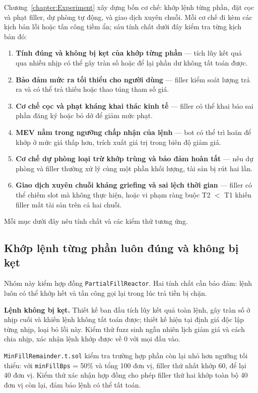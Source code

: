 \documentclass[../DoAn.tex]{subfiles}
\begin{document}
Chương~\ref{chapter:Experiment} xây dựng bốn cơ chế: khớp lệnh từng phần, đặt cọc và phạt filler, dự phòng tự động, và giao dịch xuyên chuỗi. Mỗi cơ chế đi kèm các kịch bản lỗi hoặc tấn công tiềm ẩn; sáu tính chất dưới đây kiểm tra từng kịch bản đó:
\begin{enumerate}
    \item \textbf{Tính đúng và không bị kẹt của khớp từng phần} --- tích lũy kết quả qua nhiều nhịp có thể gây tràn số hoặc để lại phần dư không tất toán được.
    \item \textbf{Bảo đảm mức ra tối thiểu cho người dùng} --- filler kiểm soát lượng trả ra và có thể trả thiếu hoặc thao túng tham số giá.
    \item \textbf{Cơ chế cọc và phạt kháng khai thác kinh tế} --- filler có thể khai báo sai phần đăng ký hoặc bỏ dở để giảm mức phạt.
    \item \textbf{MEV nằm trong ngưỡng chấp nhận của lệnh} --- bot có thể trì hoãn để khớp ở mức giá thấp hơn, trích xuất giá trị trong biên độ giảm giá.
    \item \textbf{Cơ chế dự phòng loại trừ khớp trùng và bảo đảm hoàn tất} --- nếu dự phòng và filler thường xử lý cùng một phần khối lượng, tài sản bị rút hai lần.
    \item \textbf{Giao dịch xuyên chuỗi kháng griefing và sai lệch thời gian} --- filler có thể chiếm slot mà không thực hiện, hoặc vi phạm ràng buộc T2 $<$ T1 khiến filler mất tài sản trên cả hai chuỗi.
\end{enumerate}
Mỗi mục dưới đây nêu tính chất và các kiểm thử tương ứng.

\subsection{Khớp lệnh từng phần luôn đúng và không bị kẹt}

Nhóm này kiểm hợp đồng \texttt{PartialFillReactor}. Hai tính chất cần bảo đảm: lệnh luôn có thể khớp hết và tấn công gọi lại trong lúc trả tiền bị chặn.

\textbf{Lệnh không bị kẹt.} Thiết kế ban đầu tích lũy kết quả toàn lệnh, gây tràn số ở nhịp cuối và khiến lệnh không tất toán được; thiết kế hiện tại định giá độc lập từng nhịp, loại bỏ lỗi này. Kiểm thử fuzz  sinh ngẫu nhiên lịch giảm giá và cách chia nhịp, xác nhận lệnh khớp được về 0 với mọi đầu vào.

\texttt{MinFillRemainder.t.sol} kiểm tra trường hợp phần còn lại nhỏ hơn ngưỡng tối thiểu: với \texttt{minFillBps} = 50\% và tổng 100 đơn vị, filler thứ nhất khớp 60, để lại 40 đơn vị. Kiểm thử xác nhận hợp đồng cho phép filler thứ hai khớp toàn bộ 40 đơn vị còn lại, đảm bảo lệnh có thể tất toán.
\end{document}
